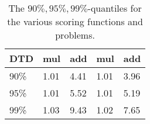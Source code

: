 \begin{table}[]
{\begin{tabular}{lllll}
     \multicolumn{1}{|l|}{DTD}       & \multicolumn{1}{l|}{mul}  & \multicolumn{1}{l|}{add}    & \multicolumn{1}{l|}{mul}   & \multicolumn{1}{l|}{add}   \\ \hline
     \multicolumn{1}{|l|}{90\%}      & \multicolumn{1}{l|}{1.01} & \multicolumn{1}{l|}{4.41}   & \multicolumn{1}{l|}{1.01}  & \multicolumn{1}{l|}{3.96}  \\ \hline
     \multicolumn{1}{|l|}{95\%}      & \multicolumn{1}{l|}{1.01} & \multicolumn{1}{l|}{5.52}   & \multicolumn{1}{l|}{1.01}  & \multicolumn{1}{l|}{5.19}  \\ \hline
     \multicolumn{1}{|l|}{99\%}      & \multicolumn{1}{l|}{1.03} & \multicolumn{1}{l|}{9.43}   & \multicolumn{1}{l|}{1.02}  & \multicolumn{1}{l|}{7.65}  \\ \hline
     \end{tabular}
     }
     \caption{The $90\%,95\%,99\%$-quantiles for the various scoring functions and problems.}
     \label{table:quantiles}
 \end{table}